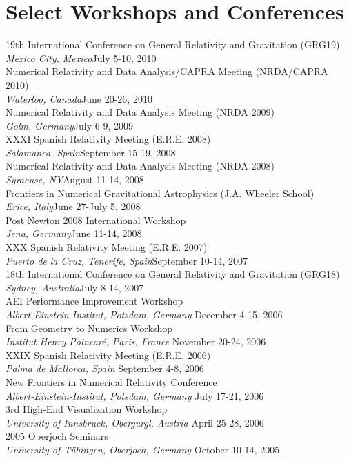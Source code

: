 \documentclass[11pt]{seilercv}
\begin{document}
\section{Select Workshops and Conferences}
19th International Conference on General Relativity and Gravitation (GRG19) \\ \bigskip
\textit{Mexico City, Mexico}\hfill July 5-10, 2010 \\
Numerical Relativity and Data Analysis/CAPRA Meeting (NRDA/CAPRA 2010) \\ \bigskip
\textit{Waterloo, Canada}\hfill June 20-26, 2010 \\
Numerical Relativity and Data Analysis Meeting (NRDA 2009) \\ \bigskip
\textit{Golm, Germany}\hfill July 6-9, 2009 \\
XXXI Spanish Relativity Meeting (E.R.E. 2008) \\ \bigskip
\textit{Salamanca, Spain}\hfill September 15-19, 2008 \\
Numerical Relativity and Data Analysis Meeting (NRDA 2008) \\ \bigskip
\textit{Syracuse, NY}\hfill August 11-14, 2008 \\
Frontiers in Numerical Gravitational Astrophysics (J.A. Wheeler School) \\ \bigskip
\textit{Erice, Italy}\hfill June 27-July 5, 2008 \\
Post Newton 2008 International Workshop \\ \bigskip
\textit{Jena, Germany}\hfill June 11-14, 2008 \\
XXX Spanish Relativity Meeting (E.R.E. 2007) \\ \bigskip
\textit{Puerto de la Cruz, Tenerife, Spain}\hfill September 10-14, 2007 \\
18th International Conference on General Relativity and Gravitation (GRG18) \\ \bigskip
\textit{Sydney, Australia}\hfill July 8-14, 2007 \\
AEI Performance Improvement Workshop \\ \bigskip
\textit{Albert-Einstein-Institut, Potsdam, Germany} \hfill December 4-15, 2006 \\
From Geometry to Numerics Workshop \\ \bigskip
\textit{Institut Henry Poincar\'{e}, Paris, France} \hfill November 20-24, 2006 \\
XXIX Spanish Relativity Meeting (E.R.E. 2006) \\ \bigskip
\textit{Palma de Mallorca, Spain} \hfill September 4-8, 2006 \\ 
New Frontiers in Numerical Relativity Conference \\ \bigskip
\textit{Albert-Einstein-Institut, Potsdam, Germany} \hfill July 17-21, 2006 \\
3rd High-End Visualization Workshop \\ \bigskip
\textit{University of Innsbruck, Obergurgl, Austria} \hfill April 25-28, 2006 \\
2005 Oberjoch Seminars \\
\textit{University of T\"{u}bingen, Oberjoch, Germany} \hfill October 10-14, 2005 
%
\end{document}
